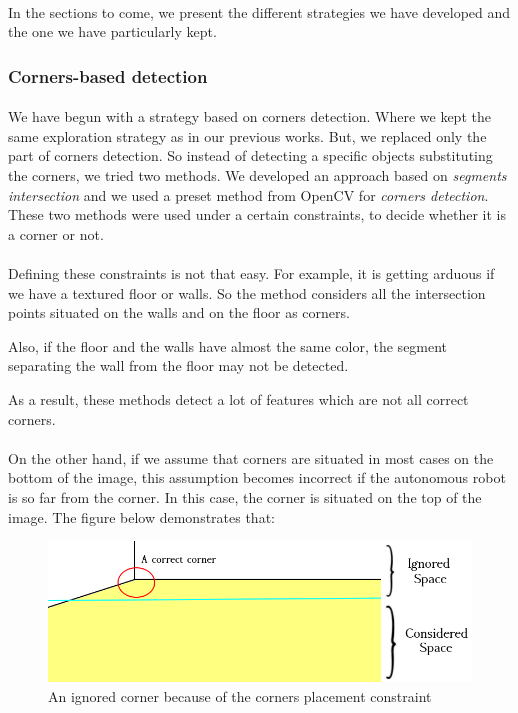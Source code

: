\documentclass[12pt]{report}
\begin{document}
	 
	 \paragraph{}
	 In the sections to come, we present the different strategies we have developed and the one we have particularly kept.
	 
	 \subsubsection{Corners-based detection}
	 \paragraph{}
	 We have begun with a strategy based on corners detection. Where we kept the same exploration strategy as in our previous works. But, we replaced only the part of corners detection. So instead of detecting a specific objects substituting the corners, we tried two methods. We developed an approach based on \textit{segments intersection} and we used a preset method from OpenCV for \textit{corners detection}. These two methods were used under a certain constraints, to decide whether it is a corner or not.
	 \paragraph{}
	 Defining these constraints is not that easy. For example, it is getting arduous if we have a textured floor or walls. So the method considers all the intersection points situated on the walls and on the floor as corners. 
	
	 Also, if the floor and the walls have almost the same color, the segment separating the wall from the floor may not be detected.
	 
	 As a result, these methods detect a lot of features which are not all correct corners.
	 
	 \paragraph{}
	 On the other hand, if we assume that corners are situated in most cases on the bottom of the image, this assumption becomes incorrect if the autonomous robot is so far from the corner. In this case, the corner is situated on the top of the image. The figure below demonstrates that:
	 	\begin{figure}[H]
	 	\begin{center}
	 		\includegraphics[scale=0.6]{res/start1_c1.png}
	 		\caption{An ignored corner because of the corners placement constraint}
	 	\end{center}
	 \end{figure}
\end{document}
